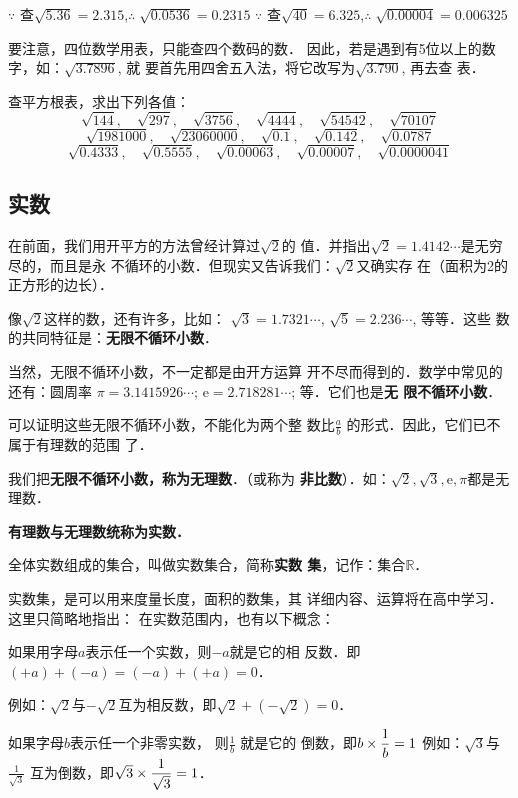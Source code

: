 $\because$ 查$\sqrt{5.36}=2.315$,\qquad $\therefore\; \sqrt{0.0536}=0.2315$
\quad$\because$ 查$\sqrt{40}=6.325$,\qquad $\therefore\; \sqrt{0.00004}=0.006325$

要注意，四位数学用表，只能查四个数码的数．
因此，若是遇到有5位以上的数字，如：$\sqrt{3.7896}$, 就
要首先用四舍五入法，将它改写为$\sqrt{3.790}$, 再去查
表．

\begin{ex}
    查平方根表，求出下列各值：
\[\sqrt{144},\quad \sqrt{297},\quad \sqrt{3756},\quad \sqrt{4444},\quad \sqrt{54542},\quad \sqrt{70107} \]
\[\sqrt{1981000},\quad \sqrt{23060000},\quad \sqrt{0.1},\quad \sqrt{0.142},\quad \sqrt{0.0787} \]
\[\sqrt{0.4333},\quad \sqrt{0.5555},\quad \sqrt{0.00063},\quad \sqrt{0.00007},\quad \sqrt{0.0000041} \]
\end{ex}

\subsection{实数}
在前面，我们用开平方的方法曾经计算过$\sqrt{2}$的
值．并指出$\sqrt{2}=1.4142\cdots$是无穷尽的，而且是永
不循环的小数．但现实又告诉我们：$\sqrt{2}$又确实存
在（面积为2的正方形的边长）．

像$\sqrt{2}$这样的数，还有许多，比如：
$\sqrt{3}=1.7321\cdots$, $\sqrt{5}=2.236\cdots$, 等等．这些
数的共同特征是：\textbf{无限不循环小数}．

当然，无限不循环小数，不一定都是由开方运算
开不尽而得到的．数学中常见的还有：圆周率
$\pi=3.1415926\cdots$; $\mathrm{e}=2.718281\cdots$; 等．它们也是\textbf{无
限不循环小数}．

可以证明这些无限不循环小数，不能化为两个整
数比$\frac{a}{b}$
的形式．因此，它们已不属于有理数的范围
了．

我们把\textbf{无限不循环小数，称为无理数}．（或称为
\textbf{非比数}）．如：$\sqrt{2},\sqrt{3},\mathrm{e},\pi$都是无理数．

\textbf{有理数与无理数统称为实数．}

全体实数组成的集合，叫做实数集合，简称\textbf{实数
集}，记作：集合$\mathbb{R}$．

实数集，是可以用来度量长度，面积的数集，其
详细内容、运算将在高中学习．这里只简略地指出：
在实数范围内，也有以下概念：

如果用字母$a$表示任一个实数，则$-a$就是它的相
反数．即$(+a)+(-a)=(-a)+(+a)=0$．

例如：$\sqrt{2}$与$-\sqrt{2}$互为相反数，即$\sqrt{2}+\left(-\sqrt{2}\right)=0$．

如果字母$b$表示任一个非零实数，
则$\frac{1}{b}$
就是它的
倒数，即$b\times\dfrac{1}{b}=1$
例如：$\sqrt{3}$与$\frac{1}{\sqrt{3}}$
互为倒数，即$\sqrt{3}\times \dfrac{1}{\sqrt{3}}=1$．

